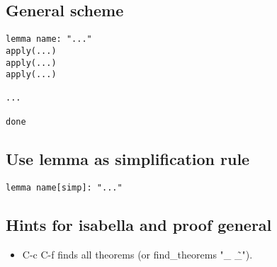 \documentclass{article}
\begin{document}
\subsection{General scheme}
\begin{verbatim}
lemma name: "..."
apply(...)
apply(...)
apply(...)

...

done

\end{verbatim}

\subsection{Use lemma as simplification rule}
\begin{verbatim}
lemma name[simp]: "..."
\end{verbatim}

\subsection {Hints for isabella and proof general}
\begin{itemize}
	\item C-c C-f finds all theorems (or find\_theorems "\_ \~ \_").
\end{itemize}
\end{document}
